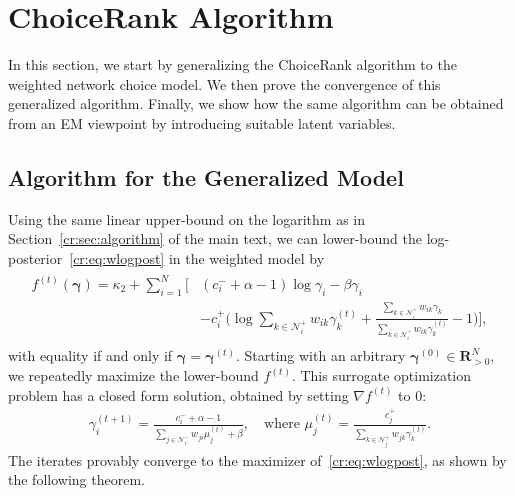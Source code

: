 \section{ChoiceRank Algorithm}  %
\label{cr:app:algorithm}

In this section, we start by generalizing the ChoiceRank algorithm to the weighted network choice model.
We then prove the convergence of this generalized algorithm.
Finally, we show how the same algorithm can be obtained from an EM viewpoint by introducing suitable latent variables.

\subsection{Algorithm for the Generalized Model}

Using the same linear upper-bound on the logarithm as in Section~\ref{cr:sec:algorithm} of the main text, we can lower-bound the log-posterior~\eqref{cr:eq:wlogpost} in the weighted model by
\begin{align}
\label{cr:eq:wminorizing}
\begin{aligned}
f^{(t)}(\bm{\gamma}) = \kappa_2 + \sum_{i = 1}^N \bigg[
    & (c^-_i + \alpha - 1) \log \gamma_i - \beta \gamma_i \\
    &- c^+_i \bigg( \log\!\sum_{k \in \mathcal{N}^+_i}\!w_{ik} \gamma^{(t)}_k
                   +\frac{\sum_{k \in \mathcal{N}^+_i}\!w_{ik} \gamma_k}{\sum_{k \in \mathcal{N}^+_i}\!w_{ik} \gamma^{(t)}_k} -1 \bigg) \bigg],
\end{aligned}
\end{align}
with equality if and only if $\bm{\gamma} = \bm{\gamma}^{(t)}$.
Starting with an arbitrary $\bm{\gamma}^{(0)} \in \mathbf{R}^N_{>0}$, we repeatedly maximize the lower-bound $f^{(t)}$.
This surrogate optimization problem has a closed form solution, obtained by setting $\nabla f^{(t)}$ to $0$:
\begin{align}
\label{cr:eq:wmmiter}
\gamma_i^{(t + 1)} = \frac{c^-_i + \alpha - 1}{\sum_{j \in \mathcal{N}^-_i} w_{ji} \mu_j^{(t)} + \beta},
    \quad \text{where }
    \mu_j^{(t)} = \frac{c^+_j}{\sum_{k \in \mathcal{N}^+_j} w_{jk} \gamma_k^{(t)}}.
\end{align}
The iterates provably converge to the maximizer of~\eqref{cr:eq:wlogpost}, as shown by the following theorem.

